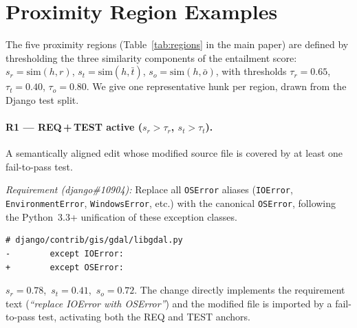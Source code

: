 

\section{Proximity Region Examples}
\label{app:region_examples}

The five proximity regions (Table~\ref{tab:regions} in the main paper) are defined
by thresholding the three similarity components of the entailment score:
$s_r = \mathrm{sim}(h,r)$,
$s_t = \mathrm{sim}(h,\bar{t})$,
$s_o = \mathrm{sim}(h,\bar{o})$,
with thresholds $\tau_r{=}0.65$, $\tau_t{=}0.40$, $\tau_o{=}0.80$.
We give one representative hunk per region, drawn from the Django test split.

\paragraph{R1 — REQ\,+\,TEST active \textnormal{($s_r > \tau_r$, $s_t > \tau_t$)}.}
A semantically aligned edit whose modified source file is covered by at least one
fail-to-pass test.

\smallskip
\noindent\textit{Requirement (django\#10904):}
Replace all \texttt{OSError} aliases (\texttt{IOError}, \texttt{EnvironmentError},
\texttt{WindowsError}, etc.) with the canonical \texttt{OSError}, following the
Python~3.3+ unification of these exception classes.

\begin{lstlisting}
# django/contrib/gis/gdal/libgdal.py
-        except IOError:
+        except OSError:
\end{lstlisting}

\noindent$s_r{=}0.78$,\ $s_t{=}0.41$,\ $s_o{=}0.72$.
The change directly implements the requirement text (\textit{``replace IOError with OSError''})
and the modified file is imported by a fail-to-pass test, activating both the REQ and TEST
anchors.

